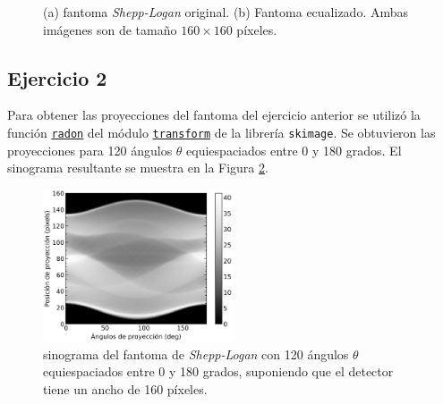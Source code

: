 \documentclass[11pt, twocolumn]{article}
\begin{document}
\begin{figure}[H]
    \centering
    \hfill
    \hfill
    \caption{(a) fantoma \textit{Shepp-Logan} original. (b) Fantoma ecualizado. Ambas imágenes son de tamaño $160 \times 160$ píxeles.}
    \label{fig:figuras_ej_1}
  \end{figure}

\subsection*{Ejercicio 2}
Para obtener las proyecciones del fantoma del ejercicio anterior se utilizó la función \href{https://scikit-image.org/docs/stable/api/skimage.transform.html#skimage.transform.radon}{\texttt{radon}} del módulo \href{https://scikit-image.org/docs/stable/api/skimage.transform.html#}{\texttt{transform}} de la librería \texttt{skimage}. Se obtuvieron las proyecciones para 120 ángulos $\theta$ equiespaciados entre 0 y 180 grados. El sinograma resultante se muestra en la Figura \ref{fig:sinograma_ej_2}.

\begin{figure} [htbp]
    \centering
    \includegraphics[width=0.5\textwidth]{images/ej_2/sinogram.png}
    \caption{sinograma del fantoma de \textit{Shepp-Logan} con 120 ángulos $\theta$ equiespaciados entre 0 y 180 grados, suponiendo que el detector tiene un ancho de 160 píxeles.}
    \label{fig:sinograma_ej_2}
\end{figure}
\end{document}
